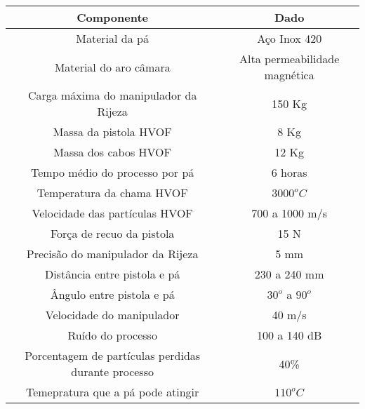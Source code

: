 \begin{table*}
\begin{tabular}{  c | c  }
  \hline
  \textbf{Componente} & \textbf{Dado} \\ \hline
  Material da pá & Aço Inox 420 \\ \hline
  Material do aro câmara & Alta permeabilidade magnética  \\ \hline
  Carga máxima do manipulador da Rijeza & 150 Kg  \\ \hline
  Massa da pistola HVOF & 8 Kg  \\ \hline
  Massa dos cabos HVOF & 12 Kg  \\ \hline
  Tempo médio do processo por pá & 6 horas \\ \hline
  Temperatura da chama HVOF & $3000^oC$ \\ \hline
  Velocidade das partículas HVOF & 700 a 1000 m/s \\ \hline
  Força de recuo da pistola & 15 N \\ \hline
  Precisão do manipulador da Rijeza & 5 mm \\ \hline
  Distância entre pistola e pá & 230 a 240 mm \\ \hline
  Ângulo entre pistola e pá & $30^o$ a $90^o$ \\ \hline
  Velocidade do manipulador & 40 m/s \\ \hline
  Ruído do processo & 100 a 140 dB \\ \hline
  Porcentagem de partículas perdidas durante processo & 40\% \\ \hline
  Temepratura que a pá pode atingir & $110^oC$ \\ \hline
  \hline
\end{tabular}

\label{tab::hvof}
\end{table*}


